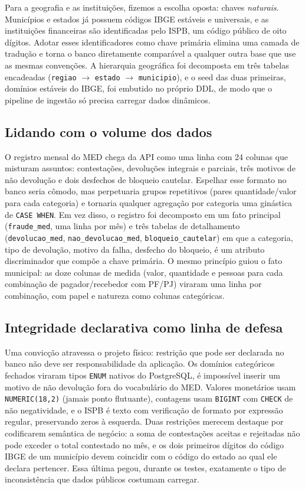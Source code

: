 \documentclass[12pt,a4paper]{article}
\newcommand{\code}[1]{\texttt{#1}}
\begin{document}
Para a geografia e as instituições, fizemos a escolha oposta: chaves
\emph{naturais}. Municípios e estados já possuem códigos IBGE estáveis e
universais, e as instituições financeiras são identificadas pelo ISPB, um
código público de oito dígitos. Adotar esses identificadores como chave
primária elimina uma camada de tradução e torna o banco diretamente
comparável a qualquer outra base que use as mesmas convenções. A hierarquia
geográfica foi decomposta em três tabelas encadeadas
(\code{regiao} $\rightarrow$ \code{estado} $\rightarrow$ \code{municipio}),
e o seed das duas primeiras, domínios estáveis do IBGE, foi embutido no
próprio DDL, de modo que o pipeline de ingestão só precisa carregar dados
dinâmicos.

\subsection{Lidando com o volume dos dados}

O registro mensal do MED chega da API como uma linha com 24 colunas que
misturam assuntos: contestações, devoluções integrais e parciais, três
motivos de não devolução e dois desfechos de bloqueio cautelar. Espelhar
esse formato no banco seria cômodo, mas perpetuaria grupos repetitivos
(pares quantidade/valor para cada categoria) e tornaria qualquer agregação
por categoria uma ginástica de \code{CASE WHEN}. Em vez disso, o registro
foi decomposto em um fato principal (\code{fraude\_med}, uma linha por mês)
e três tabelas de detalhamento (\code{devolucao\_med},
\code{nao\_devolucao\_med}, \code{bloqueio\_cautelar}) em que a categoria, tipo de devolução, motivo da falha, desfecho do bloqueio, é um
atributo discriminador que compõe a chave primária. O mesmo princípio guiou
o fato municipal: as doze colunas de medida (valor, quantidade e pessoas
para cada combinação de pagador/recebedor com PF/PJ) viraram uma linha por
combinação, com papel e natureza como colunas categóricas.

\subsection{Integridade declarativa como linha de defesa}

Uma convicção atravessa o projeto físico: restrição que pode ser declarada
no banco não deve ser responsabilidade da aplicação. Os domínios categóricos
fechados viraram tipos \code{ENUM} nativos do PostgreSQL, é impossível
inserir um motivo de não devolução fora do vocabulário do MED. Valores
monetários usam \code{NUMERIC(18,2)} (jamais ponto flutuante), contagens
usam \code{BIGINT} com \code{CHECK} de não negatividade, e o ISPB é texto
com verificação de formato por expressão regular, preservando zeros à
esquerda. Duas restrições merecem destaque por codificarem semântica de
negócio: a soma de contestações aceitas e rejeitadas não pode exceder o
total contestado no mês, e os dois primeiros dígitos do código IBGE de um
município devem coincidir com o código do estado ao qual ele declara
pertencer. Essa última pegou, durante os testes, exatamente o tipo de
inconsistência que dados públicos costumam carregar.
\end{document}
